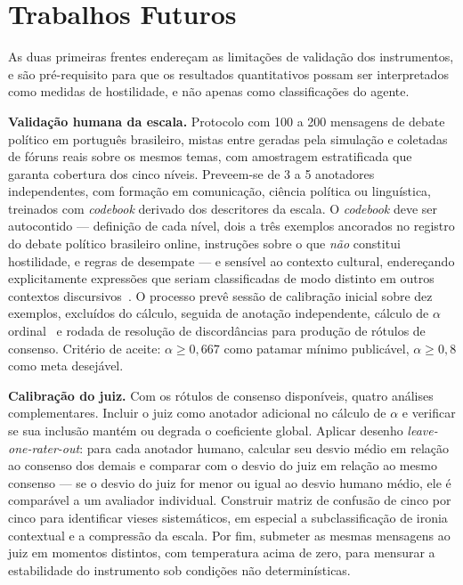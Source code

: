 \documentclass[conference]{IEEEtran} \IEEEoverridecommandlockouts %
\begin{document}
\section{Trabalhos Futuros}

As duas primeiras frentes endereçam as limitações de validação dos
instrumentos, e são pré-requisito para que os resultados quantitativos possam
ser interpretados como medidas de hostilidade, e não apenas como classificações
do agente.

\textbf{Validação humana da escala.} Protocolo com 100 a 200 mensagens de
debate político em português brasileiro, mistas entre geradas pela simulação e
coletadas de fóruns reais sobre os mesmos temas, com amostragem estratificada
que garanta cobertura dos cinco níveis. Preveem-se de 3 a 5 anotadores
independentes, com formação em comunicação, ciência política ou linguística,
treinados com \textit{codebook} derivado dos descritores da escala. O
\textit{codebook} deve ser autocontido — definição de cada nível, dois a três
exemplos ancorados no registro do debate político brasileiro online, instruções
sobre o que \textit{não} constitui hostilidade, e regras de desempate — e
sensível ao contexto cultural, endereçando explicitamente expressões que
seriam classificadas de modo distinto em outros contextos
discursivos~\cite{papacharissi2004democracy,rossini2022beyond}. O processo
prevê sessão de calibração inicial sobre dez exemplos, excluídos do cálculo,
seguida de anotação independente, cálculo de $\alpha$
ordinal~\cite{krippendorff2011computing} e rodada de resolução de discordâncias
para produção de rótulos de consenso. Critério de aceite: $\alpha \geq 0{,}667$
como patamar mínimo publicável, $\alpha \geq 0{,}8$ como meta desejável.

\textbf{Calibração do juiz.} Com os rótulos de consenso disponíveis, quatro
análises complementares. Incluir o juiz como anotador adicional no cálculo de
$\alpha$ e verificar se sua inclusão mantém ou degrada o coeficiente global.
Aplicar desenho \textit{leave-one-rater-out}: para cada anotador humano,
calcular seu desvio médio em relação ao consenso dos demais e comparar com o
desvio do juiz em relação ao mesmo consenso — se o desvio do juiz for menor ou
igual ao desvio humano médio, ele é comparável a um avaliador individual.
Construir matriz de confusão de cinco por cinco para identificar vieses
sistemáticos, em especial a subclassificação de ironia contextual e a
compressão da escala. Por fim, submeter as mesmas mensagens ao juiz em momentos
distintos, com temperatura acima de zero, para mensurar a estabilidade do
instrumento sob condições não determinísticas.
\end{document}
